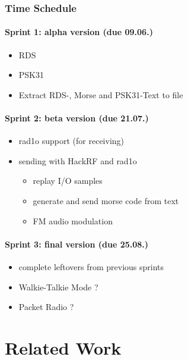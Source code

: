 \subsection{Time Schedule}

\subsubsection{Sprint 1: alpha version (due 09.06.)}
\begin{itemize}
	\item RDS
	\item PSK31
	\item Extract RDS-, Morse and PSK31-Text to file
\end{itemize}

\subsubsection{Sprint 2: beta version (due 21.07.)}
\begin{itemize}
	\item rad1o support (for receiving)
	\item sending with HackRF and rad1o
	\begin{itemize}
		\item replay I/O samples
		\item generate and send morse code from text
		\item FM audio modulation
	\end{itemize}
\end{itemize}

\subsubsection{Sprint 3: final version (due 25.08.)}
\begin{itemize}
	\item complete leftovers from previous sprints
	\item Walkie-Talkie Mode ?
	\item Packet Radio ?
\end{itemize}



\chapter{Related Work}\label{ch:relatedwork}
\glsresetall %

\lipsum[4]
